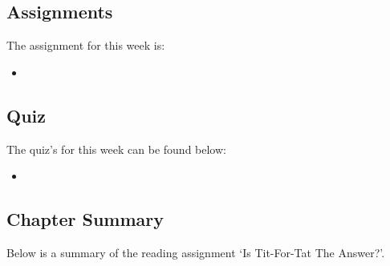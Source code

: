\subsection{Assignments}

The assignment for this week is:

\begin{itemize}
    \item {}
\end{itemize}

\subsection{Quiz}

The quiz's for this week can be found below:

\begin{itemize}
    \item {}
\end{itemize}

\subsection{Chapter Summary}

Below is a summary of the reading assignment `Is Tit-For-Tat The Answer?'.

